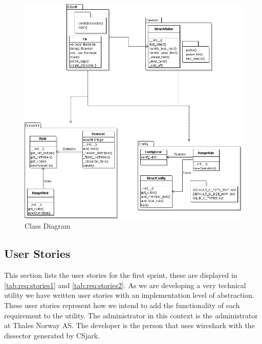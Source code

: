 \begin{figure}[!htb]
	\center
	\includegraphics[width=\textwidth]{./sprints/img/class_diagram_s1}
	\caption{Class Diagram\label{fig:sp1_class}}
\end{figure}

\subsection{User Stories}
\label{sec:req:stories1}
This section lists the user stories for the first sprint, these are displayed in \autoref{tab:req:stories1} and \autoref{tab:req:stories2}.
As we are developing a very technical \gls{utility} we have written user stories with an implementation level of abstraction. 
These user stories represent how we intend to add the functionality of each requirement to the \gls{utility}.
The administrator in this context is the administrator at Thales Norway AS. 
The developer is the person that uses \Gls{wireshark} with the \gls{dissector} generated by CSjark.

